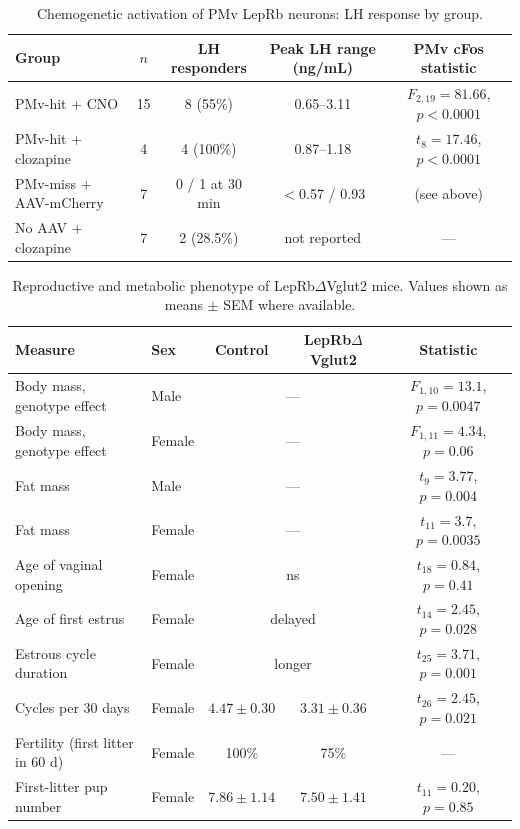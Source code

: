 \documentclass[11pt]{article}
\begin{document}



\begin{table}[htbp]
\centering
\caption{Chemogenetic activation of PMv LepRb neurons: LH response by group.}
\label{tab:dreaddsummary}
\begin{tabular}{lcccc}
\toprule
Group & $n$ & LH responders & Peak LH range (ng/mL) & PMv cFos statistic \\
\midrule
PMv-hit + CNO & 15 & 8 (55\%) & 0.65--3.11 & $F_{2,19}=81.66$, $p<0.0001$ \\
PMv-hit + clozapine & 4 & 4 (100\%) & 0.87--1.18 & $t_{8}=17.46$, $p<0.0001$ \\
PMv-miss + AAV-mCherry & 7 & 0 / 1 at 30 min & $<$0.57 / 0.93 & (see above) \\
No AAV + clozapine & 7 & 2 (28.5\%) & not reported & --- \\
\bottomrule
\end{tabular}
\end{table}

\begin{table}[htbp]
\centering
\caption{Reproductive and metabolic phenotype of LepRb$\Delta$Vglut2 mice. Values shown as means $\pm$ SEM where available.}
\label{tab:metabolic}
\begin{tabular}{p{4.0cm}lccc}
\toprule
Measure & Sex & Control & LepRb$\Delta$Vglut2 & Statistic \\
\midrule
Body mass, genotype effect & Male & \multicolumn{2}{c}{---} & $F_{1,10}=13.1$, $p=0.0047$ \\
Body mass, genotype effect & Female & \multicolumn{2}{c}{---} & $F_{1,11}=4.34$, $p=0.06$ \\
Fat mass & Male & \multicolumn{2}{c}{---} & $t_{9}=3.77$, $p=0.004$ \\
Fat mass & Female & \multicolumn{2}{c}{---} & $t_{11}=3.7$, $p=0.0035$ \\
Age of vaginal opening & Female & \multicolumn{2}{c}{ns} & $t_{18}=0.84$, $p=0.41$ \\
Age of first estrus & Female & \multicolumn{2}{c}{delayed} & $t_{14}=2.45$, $p=0.028$ \\
Estrous cycle duration & Female & \multicolumn{2}{c}{longer} & $t_{25}=3.71$, $p=0.001$ \\
Cycles per 30 days & Female & $4.47\pm0.30$ & $3.31\pm0.36$ & $t_{26}=2.45$, $p=0.021$ \\
Fertility (first litter in 60 d) & Female & 100\% & 75\% & --- \\
First-litter pup number & Female & $7.86\pm1.14$ & $7.50\pm1.41$ & $t_{11}=0.20$, $p=0.85$ \\
\bottomrule
\end{tabular}
\end{table}
\end{document}
